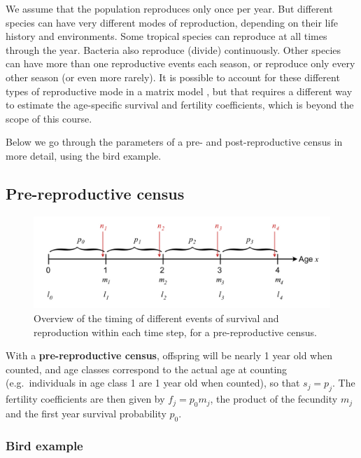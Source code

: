 \documentclass[
]{book}
\begin{document}
We assume that the population reproduces only once per year. But different species can have very different modes of reproduction, depending on their life history and environments. Some tropical species can reproduce at all times through the year. Bacteria also reproduce (divide) continuously. Other species can have more than one reproductive events each season, or reproduce only every other season (or even more rarely). It is possible to account for these different types of reproductive mode in a matrix model \citep{Caswell1}, but that requires a different way to estimate the age-specific survival and fertility coefficients, which is beyond the scope of this course.

Below we go through the parameters of a pre- and post-reproductive census in more detail, using the bird example.

\hypertarget{pre-reproductive-census}{%
\subsection{Pre-reproductive census}\label{pre-reproductive-census}}

\begin{figure}
\includegraphics[width=1\linewidth]{SurvFecPreRep2} \caption{Overview of the timing of different events of survival and reproduction within each time step, for a pre-reproductive census.}\label{fig:fig3}
\end{figure}

With a \textbf{pre-reproductive census}, offspring will be nearly 1 year old when counted, and age classes correspond to the actual age at counting (e.g.~individuals in age class 1 are 1 year old when counted), so that \(s_j=p_j\). The fertility coefficients are then given by \(f_j=p_0m_j\), the product of the fecundity \(m_j\) and the first year survival probability \(p_0\).

\hypertarget{bird-example-4}{%
\subsubsection*{Bird example}\label{bird-example-4}}
\end{document}
